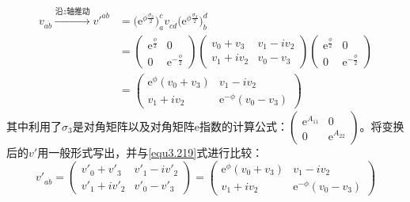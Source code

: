 \begin{align}
    v_{a\dot{b}} \stackrel{\text{沿} z \text{轴推动}}{\longrightarrow} v'^{a\dot{b}} &= \Big(\mathrm{e}^{\phi \frac{\sigma_3}{2}} \Big)^c_a v_{c \dot{d}} \Big( \mathrm{e}^{\phi \frac{\sigma_3}{2}} \Big)^{\dot{d}}_{\dot{b}} \nonumber \\
    &=  \begin{pmatrix}
            \mathrm{e}^{\frac{\phi}{2}} & 0 \\
            0 & \mathrm{e}^{- \frac{\phi}{2}}
        \end{pmatrix}
        \begin{pmatrix}
            v_0 + v_3 & v_1 - iv_2 \\
            v_1 + iv_2 & v_0 - v_3
        \end{pmatrix}
        \begin{pmatrix}
            \mathrm{e}^{\frac{\phi}{2}} & 0 \\
            0 & \mathrm{e}^{- \frac{\phi}{2}}
        \end{pmatrix}
        \nonumber \\
\label{equ3.219}
    &=  \begin{pmatrix}
            \mathrm{e}^{\phi} (v_0 + v_3) & v_1 - iv_2 \\
            v_1 + iv_2 & \mathrm{e}^{-\phi} (v_0 - v_3)
        \end{pmatrix}
\end{align}
其中利用了$\sigma_3$是对角矩阵以及对角矩阵$\mathrm{e}$指数的计算公式：$\begin{pmatrix} \mathrm{e}^{A_{11}} & 0 \\ 0 & \mathrm{e}^{A_{22}} \end{pmatrix}$。将变换后的$v'$用一般形式写出，并与\ref{equ3.219}式进行比较：
\begin{equation*}
    v'_{a\dot{b}} =
        \begin{pmatrix}
            v'_0 + v'_3 & v'_1 - iv'_2 \\
            v'_1 + iv'_2 & v'_0 - v'_3
        \end{pmatrix}
    =
        \begin{pmatrix}
            \mathrm{e}^{\phi} (v_0 + v_3) & v_1 - iv_2 \\
            v_1 + iv_2 & \mathrm{e}^{-\phi} (v_0 - v_3)
        \end{pmatrix}
\end{equation*}
